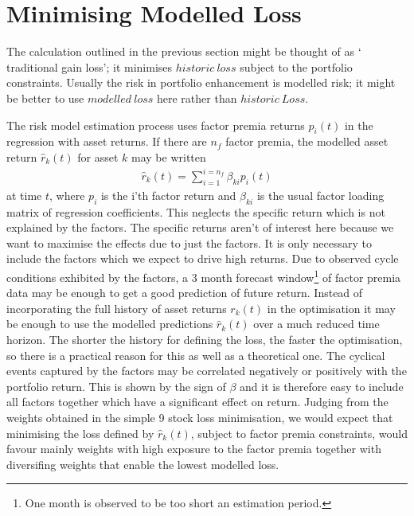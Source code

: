 \documentclass[12pt]{article}
\begin{document}
\section{Minimising Modelled Loss}
The calculation outlined in the previous section might be thought of as $`$traditional gain loss'; it
minimises $historic\ loss$ subject to the portfolio constraints. Usually the risk in 
portfolio enhancement is modelled risk; it might be better to use $modelled\ loss$ here rather than $historic\ Loss$.

The risk model estimation process uses factor premia returns $p_{i}(t)$ in the regression
with asset returns. If there are $n_f$ factor premia, the modelled asset return $\hat{r}_{k}(t)$ for asset $k$ may be written
\begin{eqnarray}
    \hat{r}_{k}(t) = \sum_{i=1}^{i=n_f}\beta_{ki} p_{i}(t)
\end{eqnarray}
at time $t$, where $p_i$ is the i'th factor return and $\beta_{ki}$ is the usual factor loading matrix of regression coefficients.
This neglects the specific return which is not explained by the factors. The specific returns aren't of interest here because we want 
to maximise the effects due to just the factors. It is only necessary to include the factors which we expect 
to drive high returns.
Due to observed cycle conditions exhibited by the factors, a 3 month forecast window\footnote{One month is observed to be too short an estimation period.} of factor premia data may be enough
to get a good prediction of future return. Instead of incorporating the full history of
asset returns $r_k(t)$ in the optimisation it may be enough to use the modelled predictions
$\hat{r}_{k}(t)$ over a much reduced time horizon. The shorter the history for defining the
loss, the faster the optimisation, so there is a practical reason for this as well as
a theoretical one. The cyclical events captured by the factors may be correlated negatively or positively with 
the portfolio return. This is shown by the sign of $\beta$ and it is therefore easy to include all factors together 
which have a significant effect on return.
Judging from the weights obtained in the simple 9 stock loss minimisation, we would expect 
that minimising the loss defined by $\hat{r}_{k}(t)$, subject to factor premia constraints, would favour mainly weights 
with high exposure to the factor premia together with diversifing weights that enable the lowest modelled loss.
\end{document}
